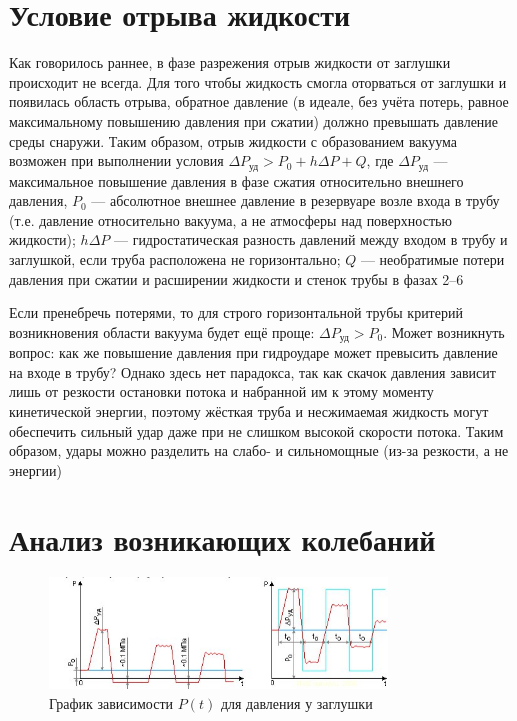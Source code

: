 \documentclass[a4paper, 14pt]{article}
\begin{document}
    \section{Условие отрыва жидкости}

    Как говорилось раннее, в фазе разрежения отрыв жидкости от заглушки происходит не всегда.
    Для того чтобы жидкость смогла оторваться от заглушки и появилась область отрыва, обратное давление (в идеале,
    без учёта потерь, равное максимальному повышению давления при сжатии) должно превышать давление среды снаружи.
    Таким образом, отрыв жидкости с образованием вакуума возможен при выполнении условия $\Delta P_{\text{уд}} > P_0
    + h \Delta P + Q $, где $\Delta P_{\text{уд}}$ --- максимальное повышение давления в фазе сжатия относительно
    внешнего давления, $P_0$ --- абсолютное внешнее давление в резервуаре возле входа в трубу (т.е. давление
    относительно вакуума, а не атмосферы над поверхностью жидкости); $h \Delta P$ --- гидростатическая разность
    давлений между входом в трубу и заглушкой, если труба расположена не горизонтально; $Q$ --- необратимые потери
    давления при сжатии и расширении жидкости и стенок трубы в фазах 2--6

    Если пренебречь потерями, то для строго горизонтальной трубы критерий возникновения области вакуума будет ещё
    проще: $\Delta P_{\text{уд}} > P_0$.
    Может возникнуть вопрос: как же повышение давления при гидроударе может превысить давление на входе в трубу?
    Однако здесь нет парадокса, так как скачок давления зависит лишь от резкости остановки потока и набранной им к
    этому моменту кинетической энергии, поэтому жёсткая труба и несжимаемая жидкость могут обеспечить сильный удар
    даже при не слишком высокой скорости потока.
    Таким образом, удары можно разделить на слабо- и сильномощные (из-за резкости, а не энергии)


    \section{Анализ возникающих колебаний}

    \begin{figure} [h]
        \begin{center}
            \includegraphics[width=0.8\textwidth]{flucts}
        \end{center}
        \caption{График зависимости $P(t)$ для давления у заглушки~\cite{3}}
    \end{figure}
\end{document}
